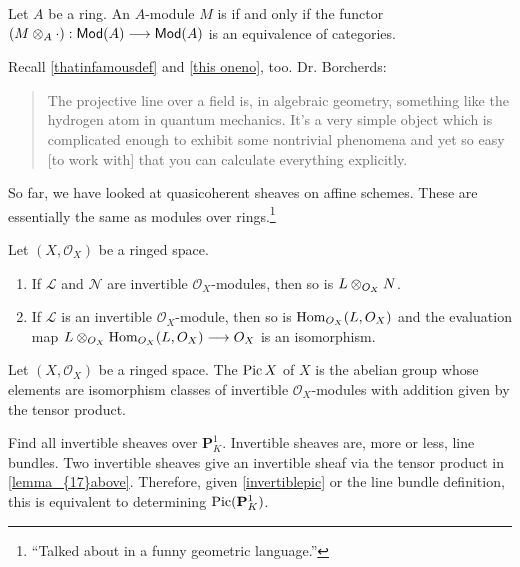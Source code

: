 \documentclass [11 pt, oneside] {article}
\begin{document}
\begin{definition}\label{}\text{}
Let $A$ be a ring. An $A$-module $M$ is  if and only if the functor $(M\otimes_A \cdot) : \textsf{Mod}(A) \longrightarrow \textsf{Mod}(A)$ is an equivalence of categories.
\end{definition}


Recall \cref{thatinfamousdef} and \cref{this oneno}, too. 
Dr. Borcherds:
\begin{quote}
	\small The projective line over a field is, in algebraic geometry, something like the hydrogen atom in quantum mechanics. It's a very simple object which is complicated enough to exhibit some nontrivial phenomena and yet so easy [to work with] that you can calculate everything explicitly.
\end{quote}
So far, we have looked at quasicoherent sheaves on affine schemes. These are essentially the same as modules over rings.\footnote{``Talked about in a funny geometric language.''}
\begin{proposition}\label{lemma_{17}above}
	Let $(X,\mathscr{O}_X)$ be a ringed space.
	\begin{enumerate}
		\item If $\mathscr{L}$ and $\mathscr{N}$ are invertible $\mathscr{O}_X$-modules, then so is $\relax{L}\otimes_{\relax{O}_X}\relax{N}$.
		\item If $\mathscr{L}$ is an invertible $\mathscr{O}_X$-module, then so is $\operatorname{Hom}_{\relax{O}_X}(\relax{L}, \relax{O}_X)$ and the evaluation map $\relax{L}\otimes_{\relax{O}_X} \operatorname{Hom}_{\relax{O}_X}(\relax{L}, \relax{O}_X)\longrightarrow \relax{O}_X$ is an isomorphism.
	\end{enumerate}
\end{proposition}
 \begin{definition}\label{invertiblepic}\text{}
Let $(X,\mathscr{O}_X)$ be a ringed space. The  $\operatorname{Pic} X$ of $X$ is the abelian group whose elements are isomorphism classes of invertible $\mathscr{O}_X$-modules with addition given by the tensor product.
\end{definition}

\begin{problem}
	Find all invertible sheaves over $\mathbf{P}^1_K$. Invertible sheaves are, more or less, line bundles. Two invertible sheaves give an invertible sheaf via the tensor product in \cref{lemma_{17}above}. Therefore, given \cref{invertiblepic} or the line bundle definition, this is equivalent to determining $\operatorname{Pic}(\mathbf{P}^1_K)$.
\end{problem}
\end{document}

